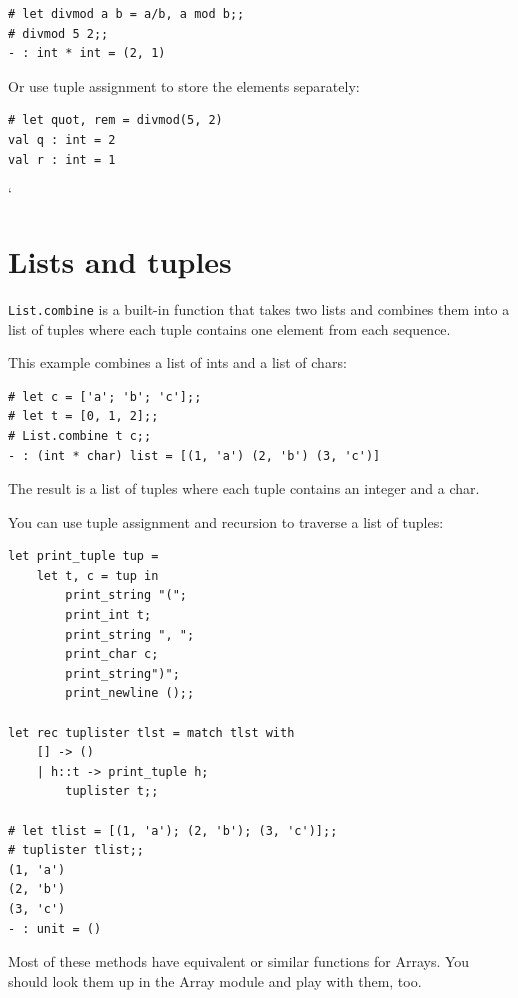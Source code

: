 \documentclass[10pt]{book}
\begin{document}
{\beforeverb
\begin{verbatim}
# let divmod a b = a/b, a mod b;;
# divmod 5 2;;
- : int * int = (2, 1)
\end{verbatim}
\afterverb
%
Or use tuple assignment to store the elements separately:


\beforeverb
\begin{verbatim}
# let quot, rem = divmod(5, 2)
val q : int = 2
val r : int = 1
\end{verbatim}
`\afterverb

\section{Lists and tuples}


{\tt List.combine} is a built-in function that takes two lists and
combines them into a list of tuples where each tuple contains one 
element from each sequence.

This example combines a list of ints and a list of chars:

\beforeverb
\begin{verbatim}
# let c = ['a'; 'b'; 'c'];;
# let t = [0, 1, 2];;
# List.combine t c;;
- : (int * char) list = [(1, 'a') (2, 'b') (3, 'c')]
\end{verbatim}
\afterverb
%
The result is a list of tuples where each tuple contains
an integer and a char.


You can use tuple assignment and recursion to traverse a list of
tuples:


\beforeverb
\begin{verbatim}
let print_tuple tup = 
	let t, c = tup in
		print_string "(";
		print_int t;
		print_string ", ";
		print_char c;
		print_string")";
		print_newline ();;

let rec tuplister tlst = match tlst with 
	[] -> ()
	| h::t -> print_tuple h;
		tuplister t;;

# let tlist = [(1, 'a'); (2, 'b'); (3, 'c')];;
# tuplister tlist;;
(1, 'a')
(2, 'b')
(3, 'c')
- : unit = () 
\end{verbatim}
\afterverb

\begin{ex}
Most of these methods have equivalent or similar functions for Arrays. You should look them up in the Array module and play with them, too.
\end{ex}

}
\end{document}
